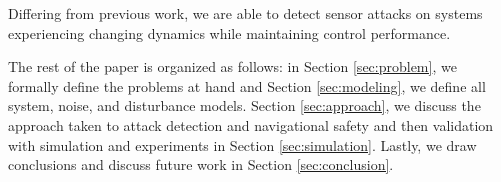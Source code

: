 Differing from previous work, we are able to detect sensor attacks on systems experiencing changing dynamics while maintaining control performance.

The rest of the paper is organized as follows: in Section \ref{sec:problem}, we formally define the problems at hand and Section \ref{sec:modeling}, we define all system, noise, and disturbance models. Section \ref{sec:approach}, we discuss the approach taken to attack detection and navigational safety and then validation with simulation and experiments in Section \ref{sec:simulation}. Lastly, we draw conclusions and discuss future work in Section \ref{sec:conclusion}.


